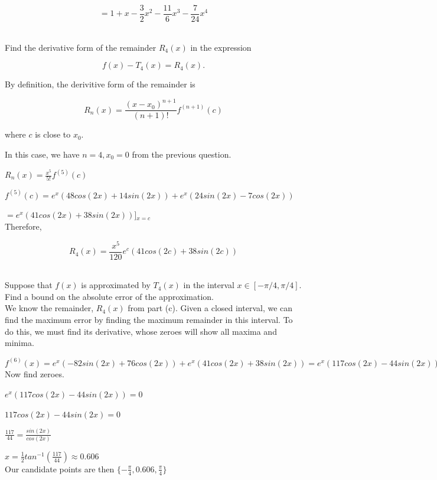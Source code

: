 	$$= 1+x-\frac{3}{2} x^2 - \frac{11}{6} x^3 - \frac{7}{24} x^4$$ \\


\item Find the derivative form of the remainder $R_4(x)$ in the expression

\[
f(x) - T_4(x) = R_4(x).
\]

	By definition, the derivitive form of the remainder is

	$$R_n(x) = \frac{(x-x_0)^{n+1}}{(n+1)!} f^{(n+1)}(c)$$

	where $c$ is close to $x_0$.

	In this case, we have $n=4, x_0 = 0$ from the previous question.

	\newpage

	$R_n(x) = \frac{x^5}{5!}f^{(5)}(c)$

	$f^{(5)}(c) = e^x(48cos(2x) + 14sin(2x)) + e^x(24sin(2x) - 7cos(2x))$

	$= e^x(41cos(2x)+38sin(2x))$]$_{x=c}$ \\

	Therefore,

	$$R_4(x) = \frac{x^5}{120} e^c(41cos(2c)+38sin(2c))$$ \\

\item Suppose that $f(x)$ is approximated by $T_4(x)$ in the interval $x \in [-\pi/4,\pi/4].$  Find a bound on the absolute error of the approximation. \\

	We know the remainder, $R_4(x)$ from part (c). Given a closed interval, we can find the maximum error by
	finding the maximum remainder in this interval. To do this, we must find its derivative,
	whose zeroes will show all maxima and minima.

	$f^{(6)}(x) = e^x(-82sin(2x)+76cos(2x)) + e^x(41cos(2x) + 38sin(2x)) = e^x(117cos(2x) - 44sin(2x))$ \\

	Now find zeroes.

	$e^x(117cos(2x)-44sin(2x)) = 0$

	$117cos(2x)-44sin(2x) = 0$

	$\frac{117}{44} = \frac{sin(2x)}{cos(2x)}$

	$x = \frac{1}{2} tan^{-1}(\frac{117}{44}) \approx 0.606$ \\

	Our candidate points are then $\{-\frac{\pi}{4}, 0.606, \frac{\pi}{4} \}$ \\

